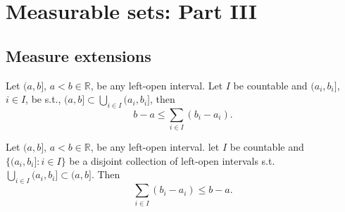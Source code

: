 \chapter{Measurable sets: Part III}%
\label{cha:Measurable sets: Part III}
\section{Measure extensions}%
\label{sec:Measure extensions}

\begin{proposition}[]
    \label{prop:6.1}
    Let $(a,b]$, $a < b\in \mathbb{R}$, be any left-open interval. Let $I$ be countable and $(a_i,b_i]$, $i\in I$, be s.t.,
    $(a,b]\subset \bigcup_{i \in  I}(a_i,b_i] $, then
    \[
        b-a \le \sum_{i \in I} (b_i - a_i) \tag{10}
    .\] 
\end{proposition}

\begin{proposition}[]
    \label{prop:6.2}
    Let $(a,b]$,  $a < b \in \mathbb{R}$, be any left-open interval. let $I$ be countable and $\{(a_i,b_i]: i \in I\}$ be a 
    disjoint collection of left-open intervals s.t. $\bigcup_{i \in  I}(a_i, b_i] \subset (a,b]$. Then
    \[
    \sum_{i\in I}(b_i - a_i) \le b-a
    .\] 
\end{proposition}

